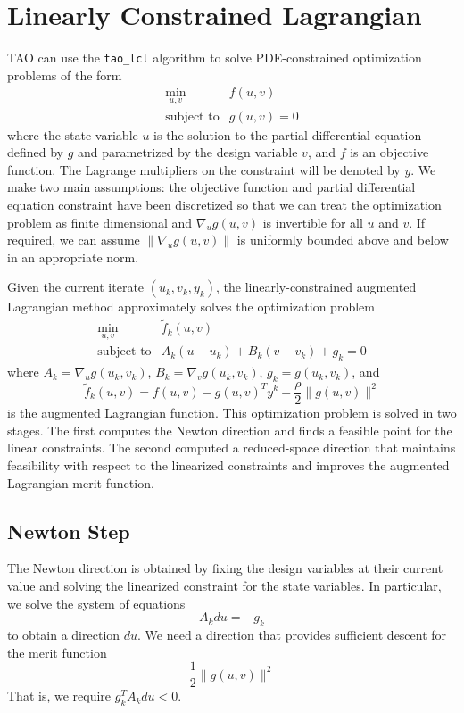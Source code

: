 \section{Linearly Constrained Lagrangian}
\label{sec:lcl}

TAO can use the {\tt tao\_lcl} algorithm to 
solve PDE-constrained optimization problems of the form
\[
\begin{array}{ll}
\displaystyle \min_{u,v} & f(u,v) \\
\mbox{subject to} & g(u,v) = 0
\end{array}
\]
where the state variable $u$ is the solution to the partial differential 
equation defined by $g$ and parametrized by the design variable $v$, and 
$f$ is an objective function.  The Lagrange multipliers on the constraint
will be denoted by $y$.  We make two main assumptions: the objective function 
and partial differential equation constraint have been discretized so that 
we can treat the optimization problem as finite dimensional and 
$\nabla_u g(u,v)$ is invertible for all $u$ and $v$.  If required, we
can assume $\|\nabla_u g(u,v)\|$ is uniformly bounded above and below 
in an appropriate norm.


Given the current iterate $(u_k, v_k, y_k)$, the linearly-constrained
augmented Lagrangian method approximately solves the optimization 
problem
\[
\begin{array}{ll}
\displaystyle \min_{u,v} & \tilde{f}_k(u, v) \\
\mbox{subject to} & A_k (u-u_k) + B_k (v-v_k) + g_k = 0
\end{array}
\]
where $A_k = \nabla_u g(u_k,v_k)$, $B_k = \nabla_v g(u_k,v_k)$, 
$g_k = g(u_k, v_k)$, and 
\[
\tilde{f}_k(u,v) = f(u,v) - g(u,v)^T y^k + \frac{\rho}{2} \| g(u,v) \|^2
\]
is the augmented Lagrangian function.  This optimization problem is
solved in two stages.  The first computes the Newton direction and
finds a feasible point for the linear constraints.  The second 
computed a reduced-space direction that maintains feasibility
with respect to the linearized constraints and improves the
augmented Lagrangian merit function.
\subsection{Newton Step}

The Newton direction is obtained by fixing the design variables at
their current value and solving the linearized constraint for the
state variables.  In particular, we solve the system of equations
\[
A_k du = -g_k
\]
to obtain a direction $du$.  We need a direction that provides
sufficient descent for the merit function
\[
  \frac{1}{2} \|g(u,v)\|^2
\]
That is, we require $g_k^T A_k du < 0$.  

